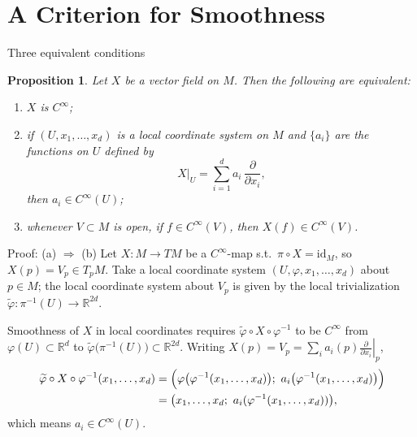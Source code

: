 \documentclass[10pt]{beamer}
\newtheorem{proposition}{Proposition}
\newcommand{\R}{\mathbb{R}}
\begin{document}
\section{A Criterion for Smoothness}

\begin{frame}{Three equivalent conditions}
	\begin{proposition}
		Let $X$ be a vector field on $M$. Then the following are
		equivalent:
		\begin{enumerate}
			\item[(a)] $X$ is $C^\infty$;
			\item[(b)] if $(U, x_1, \dots, x_d)$ is a local coordinate
			      system on $M$ and $\{a_i\}$ are the functions on $U$
			      defined by
			      \[
				      X\big|_U = \sum_{i=1}^{d} a_i\,
				      \frac{\partial}{\partial x_i},
			      \]
			      then $a_i \in C^\infty(U)$;
			\item[(c)] whenever $V \subset M$ is open, if
			      $f \in C^\infty(V)$, then $X(f) \in C^\infty(V)$.
		\end{enumerate}
	\end{proposition}
\end{frame}

\begin{frame}{Proof: (a) $\Rightarrow$ (b)}
	Let $X : M \to TM$ be a $C^\infty$-map s.t.\ $\pi \circ X =
		\mathrm{id}_M$, so $X(p) = V_p \in T_p M$. Take a local coordinate
	system $(U, \varphi, x_1, \dots, x_d)$ about $p \in M$; the local
	coordinate system about $V_p$ is given by the local trivialization
	$\widetilde{\varphi} : \pi^{-1}(U) \to \R^{2d}$.
	\medskip

	Smoothness of $X$ in local coordinates requires
	$\widetilde{\varphi} \circ X \circ \varphi^{-1}$ to be $C^\infty$
	from $\varphi(U) \subset \R^d$ to
	$\widetilde{\varphi}\bigl(\pi^{-1}(U)\bigr) \subset \R^{2d}$.
	Writing $X(p) = V_p = \sum_i a_i(p) \left. \frac{\partial}{\partial
			x_i} \right|_{p}$,
	\begin{align*}
		\widetilde{\varphi} \circ X \circ \varphi^{-1}(x_1, \dots, x_d)
		 & = \Bigl( \varphi\bigl(\varphi^{-1}(x_1, \dots, x_d)\bigr);\
		a_i\bigl(\varphi^{-1}(x_1, \dots, x_d)\bigr) \Bigr)                      \\
		 & = \bigl( x_1, \dots, x_d;\ a_i(\varphi^{-1}(x_1, \dots, x_d)) \bigr),
	\end{align*}
	which means $a_i \in C^\infty(U)$.
\end{frame}
\end{document}
